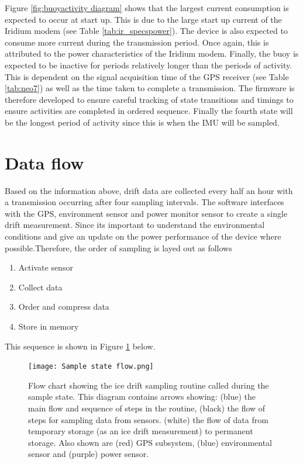 Figure \ref{fig:buoyactivity diagram} shows that the largest current consumption is expected to occur at start up. This is due to the large start up current of the Iridium modem (see Table \ref{tab:ir_specspower}). The device is also expected to consume more current during the transmission period. Once again, this is attributed to the power characteristics of the Iridium modem. Finally, the buoy is expected to be inactive for periods relatively longer than the periods of activity. This is dependent on the signal acquisition time of the GPS receiver (see Table \ref{tab:neo7}) as well as the time taken to complete a transmission. The firmware is therefore developed to ensure careful tracking of state transitions and timings to ensure activities are completed in ordered sequence. Finally the fourth state will be the longest period of activity since this is when the IMU will be sampled.
\section{Data flow}
\label{sec:data_flow}

Based on the information above, drift data are collected every half an hour with a transmission occurring after four sampling intervals. The software interfaces with the GPS, environment sensor and power monitor sensor to create a single drift measurement. Since its important to understand the environmental conditions and give an update on the power performance of the device where possible.Therefore, the order of sampling is layed out as follows

\begin{enumerate}
	\item Activate sensor
	\item Collect data
	\item Order and compress data
	\item Store in memory
\end{enumerate}

This sequence is shown in Figure \ref{fig:sampleflow} below.

\begin{figure}[H]
	\centering
	\texttt{[image: Sample state flow.png]}
	\caption{Flow chart showing the ice drift sampling routine called during the sample state. This diagram contains arrows showing: (blue) the main flow and sequence of steps in the routine, (black) the flow of steps for sampling data from sensors. (white) the flow of data from temporary storage (as an ice drift measurement) to permanent storage. Also shown are (red) GPS subsystem, (blue) environmental sensor and (purple) power sensor.}
	\label{fig:sampleflow}
\end{figure}

